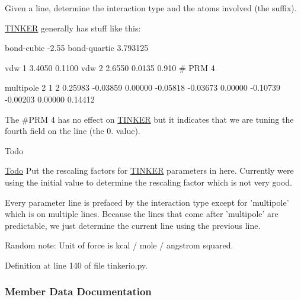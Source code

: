 Given a line, determine the interaction type and the atoms involved (the suffix). 

\hyperlink{classsrc_1_1tinkerio_1_1TINKER}{T\+I\+N\+K\+ER} generally has stuff like this\+:

\begin{DoxyVerb}         bond-cubic              -2.55
         bond-quartic            3.793125
 
         vdw           1               3.4050     0.1100
         vdw           2               2.6550     0.0135      0.910 # PRM 4
 
         multipole     2    1    2               0.25983
                                                -0.03859    0.00000   -0.05818
                                                -0.03673
                                                 0.00000   -0.10739
                                                -0.00203    0.00000    0.14412\end{DoxyVerb}


The \textquotesingle{}\#\+P\+RM 4\textquotesingle{} has no effect on \hyperlink{classsrc_1_1tinkerio_1_1TINKER}{T\+I\+N\+K\+ER} but it indicates that we are tuning the fourth field on the line (the 0. value).

\begin{DoxyRefDesc}{Todo}
\item[\hyperlink{todo__todo000016}{Todo}]Put the rescaling factors for \hyperlink{classsrc_1_1tinkerio_1_1TINKER}{T\+I\+N\+K\+ER} parameters in here. Currently we\textquotesingle{}re using the initial value to determine the rescaling factor which is not very good.\end{DoxyRefDesc}
\begin{DoxyVerb}     Every parameter line is prefaced by the interaction type
     except for 'multipole' which is on multiple lines.  Because
     the lines that come after 'multipole' are predictable, we just
     determine the current line using the previous line.

     Random note: Unit of force is kcal / mole / angstrom squared.\end{DoxyVerb}
 

Definition at line 140 of file tinkerio.\+py.



\subsubsection{Member Data Documentation}
\mbox{\label{classsrc_1_1tinkerio_1_1Tinker__Reader_a35bc6d08ba78332cb55415646373893a}} 
